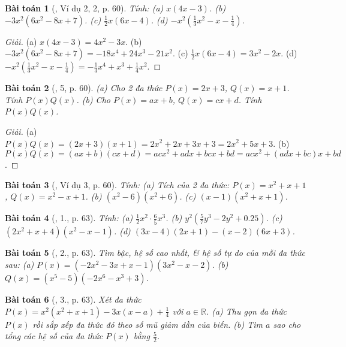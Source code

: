 \documentclass{article}
\newtheorem{baitoan}{Bài toán}
\begin{document}
\begin{baitoan}[\cite{SGK_Toan_7_Canh_Dieu_tap_2}, Ví dụ 2, 2, p. 60]
	Tính: (a) $x(4x - 3)$. (b) $-3x^2(6x^2 - 8x + 7)$. (c) $\frac{1}{2}x(6x - 4)$. (d) $-x^2\left(\frac{1}{3}x^2 - x - \frac{1}{4}\right)$.
\end{baitoan}

\begin{proof}[Giải]
	(a) $x(4x - 3) = 4x^2 - 3x$. (b) $-3x^2(6x^2 - 8x + 7) = -18x^4 + 24x^3 - 21x^2$. (c) $\frac{1}{2}x(6x - 4) = 3x^2 - 2x$. (d) $-x^2\left(\frac{1}{3}x^2 - x - \frac{1}{4}\right) = -\frac{1}{3}x^4 + x^3 + \frac{1}{4}x^2$.
\end{proof}

\begin{baitoan}[\cite{SGK_Toan_7_Canh_Dieu_tap_2}, 5, p. 60]
	(a) Cho 2 đa thức $P(x) = 2x + 3$, $Q(x) = x + 1$. Tính $P(x)Q(x)$. (b) Cho $P(x) = ax + b$, $Q(x) = cx + d$. Tính $P(x)Q(x)$.
\end{baitoan}

\begin{proof}[Giải]
	(a) $P(x)Q(x) = (2x + 3)(x + 1) = 2x^2 + 2x + 3x + 3 = 2x^2 + 5x + 3$. (b) $P(x)Q(x) = (ax + b)(cx + d) = acx^2 + adx + bcx + bd = acx^2 + (adx + bc)x + bd$.
\end{proof}

\begin{baitoan}[\cite{SGK_Toan_7_Canh_Dieu_tap_2}, Ví dụ 3, p. 60]
	Tính: (a) Tích của 2 đa thức: $P(x) = x^2 + x + 1$, $Q(x) = x^2 - x + 1$. (b) $(x^2 - 6)(x^2 + 6)$. (c) $(x - 1)(x^2 + x + 1)$.
\end{baitoan}

\begin{baitoan}[\cite{SGK_Toan_7_Canh_Dieu_tap_2}, 1., p. 63]
	Tính: (a) $\frac{1}{2}x^2\cdot\frac{6}{5}x^3$. (b) $y^2\left(\frac{5}{7}y^3 - 2y^2 + 0.25\right)$. (c) $(2x^2 + x + 4)(x^2 - x - 1)$. (d) $(3x - 4)(2x + 1) - (x - 2)(6x + 3)$.
\end{baitoan}

\begin{baitoan}[\cite{SGK_Toan_7_Canh_Dieu_tap_2}, 2., p. 63]
	Tìm bậc, hệ số cao nhất, \& hệ số tự do của mỗi đa thức sau: (a) $P(x) = (-2x^2 - 3x + x - 1)(3x^2 - x - 2)$. (b) $Q(x) = (x^5 - 5)(-2x^6 - x^3 + 3)$.
\end{baitoan}

\begin{baitoan}[\cite{SGK_Toan_7_Canh_Dieu_tap_2}, 3., p. 63]
	Xét đa thức $P(x) = x^2(x^2 + x + 1) - 3x(x - a) + \frac{1}{4}$ với $a\in\mathbb{R}$. (a) Thu gọn đa thức $P(x)$ rồi sắp xếp đa thức đó theo số mũ giảm dần của biến. (b) Tìm $a$ sao cho tổng các hệ số của đa thức $P(x)$ bằng $\frac{5}{2}$.
\end{baitoan}
\end{document}
